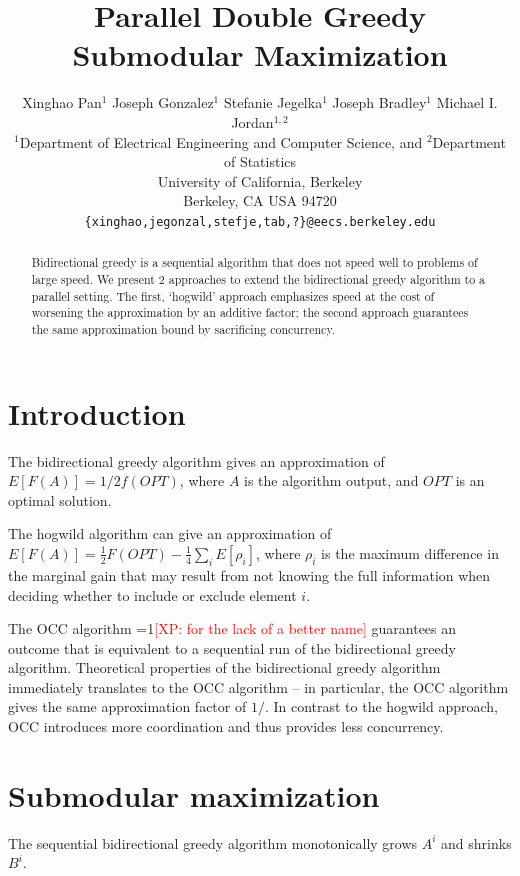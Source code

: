 \documentclass{article} %
\title{Parallel Double Greedy Submodular Maximization}
\author{
Xinghao Pan$^1$ Joseph Gonzalez$^1$ Stefanie Jegelka$^1$ Joseph Bradley$^{1}$ Michael I. Jordan$^{1,2}$\\
$^1$Department of Electrical Engineering and Computer Science, and $^2$Department of Statistics\\
University of California, Berkeley\\
Berkeley, CA USA 94720\\
  \texttt{\{xinghao,jegonzal,stefje,tab,?\}@eecs.berkeley.edu} \\
}
\newcommand{\Comments}{1}
\newcommand{\note}[2]{\ifnum\Comments=1\textcolor{#1}{#2}\fi}
\newcommand{\xinghao}[1]{\note{red}{[XP: #1]}}
\begin{document}
\maketitle


\begin{abstract}
Bidirectional greedy is a sequential algorithm that does not speed well to problems of large speed.
We present 2 approaches to extend the bidirectional greedy algorithm to a parallel setting.
The first, `hogwild' approach emphasizes speed at the cost of worsening the approximation by an additive factor;
the second approach guarantees the same approximation bound by sacrificing concurrency.
\end{abstract}

\section{Introduction}
The bidirectional greedy algorithm \cite{buchbinder2012} gives an approximation of $E[F(A)] = 1/2 f(OPT)$, where $A$ is the algorithm output, and $OPT$ is an optimal solution.

The hogwild algorithm can give an approximation of $E[F(A)] = \frac{1}{2} F(OPT) - \frac{1}{4}\sum_iE[\rho_i]$, where $\rho_i$ is the maximum difference in the marginal gain that may result from not knowing the full information when deciding whether to include or exclude element $i$.

The OCC algorithm \xinghao{for the lack of a better name} guarantees an outcome that is equivalent to a sequential run of the bidirectional greedy algorithm.
Theoretical properties of the bidirectional greedy algorithm immediately translates to the OCC algorithm -- in particular, the OCC algorithm gives the same approximation factor of $1/$.
In contrast to the hogwild approach, OCC introduces more coordination and thus provides less concurrency.











\section{Submodular maximization}

The sequential bidirectional greedy \cite{buchbinder2012} algorithm monotonically grows $A^i$ and shrinks $B^i$.
\end{document}
